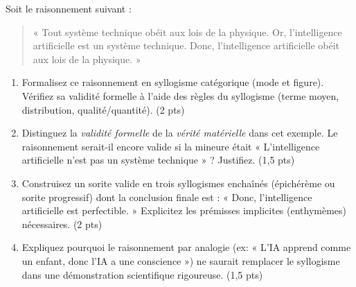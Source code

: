 \documentclass[11pt]{article}
\begin{document}
\begin{exercice}
Soit le raisonnement suivant : 
\begin{quote}
« Tout système technique obéit aux lois de la physique. Or, l'intelligence artificielle est un système technique. Donc, l'intelligence artificielle obéit aux lois de la physique. »
\end{quote}
\begin{enumerate}
    \item Formalisez ce raisonnement en syllogisme catégorique (mode et figure). Vérifiez sa validité formelle à l'aide des règles du syllogisme (terme moyen, distribution, qualité/quantité). (2 pts)
    \item Distinguez la \textit{validité formelle} de la \textit{vérité matérielle} dans cet exemple. Le raisonnement serait-il encore valide si la mineure était « L'intelligence artificielle n'est pas un système technique » ? Justifiez. (1,5 pts)
    \item Construisez un sorite valide en trois syllogismes enchaînés (épichérème ou sorite progressif) dont la conclusion finale est : « Donc, l'intelligence artificielle est perfectible. » Explicitez les prémisses implicites (enthymèmes) nécessaires. (2 pts)
    \item Expliquez pourquoi le raisonnement par analogie (ex: « L'IA apprend comme un enfant, donc l'IA a une conscience ») ne saurait remplacer le syllogisme dans une démonstration scientifique rigoureuse. (1,5 pts)
\end{enumerate}
\end{exercice}
\end{document}
